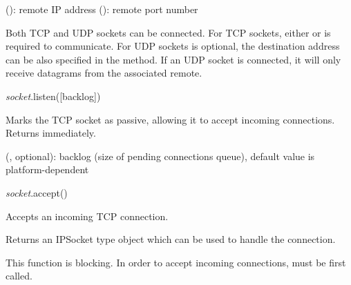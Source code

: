 \documentclass[a4paper,12pt,twoside,extrafontsizes]{memoir}
\begin{document}
\begin{funcparams}
	 (): remote IP address
	 (): remote port number
\end{funcparams}

\begin{funcremarks}
	Both TCP and UDP sockets can be connected. For TCP sockets, either  or  is required to communicate. For UDP sockets  is optional, the destination address can be also specified in the  method. If an UDP socket is connected, it will only receive datagrams from the associated remote.
\end{funcremarks}


\begin{luafuncprototype}
	\emph{socket}.listen([backlog])
\end{luafuncprototype}

\begin{funcdescr}
	Marks the TCP socket as passive, allowing it to accept incoming connections. Returns immediately.
\end{funcdescr}

\begin{funcparams}
	 (, optional): backlog (size of pending connections queue), default value is platform-dependent
\end{funcparams}


\begin{luafuncprototype}
	\emph{socket}.accept()
\end{luafuncprototype}

\begin{funcdescr}
	Accepts an incoming TCP connection.
\end{funcdescr}

\begin{funcret}
	Returns an IPSocket type object which can be used to handle the connection.
\end{funcret}

\begin{funcremarks}
	This function is blocking. In order to accept incoming connections,  must be first called.
\end{funcremarks}
\end{document}
